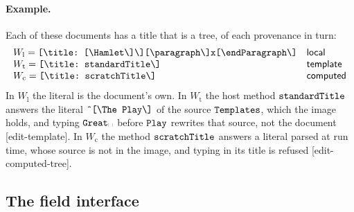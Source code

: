 \documentclass[11pt]{article}
\numberwithin{equation}{section}
\newcommand{\kw}[1]{\ensuremath{\mathsf{#1}}}
\newcommand{\str}[1]{\ensuremath{\text{\texttt{#1}}}}
\newcommand{\bs}{\textbackslash}
\newcommand{\vs}{\text{\textvisiblespace}}
\begin{document}
\paragraph{Example.}  Each of these documents has a title that is a tree,
of each provenance in turn:
\[
\begin{array}{@{}ll@{}}
W_{\mathrm{l}} = \str{[\bs{}title:\ [\bs{}Hamlet\bs]\bs][\bs{}paragraph\bs]x[\bs{}endParagraph\bs]}
  & \kw{local} \\
W_{\mathrm{t}} = \str{[\bs{}title:\ standardTitle\bs]} & \kw{template} \\
W_{\mathrm{c}} = \str{[\bs{}title:\ scratchTitle\bs]} & \kw{computed}
\end{array}
\]
In $W_{\mathrm{l}}$ the literal is the document's own.  In
$W_{\mathrm{t}}$ the host method $\str{standardTitle}$ answers the literal
$\str{\^{}[\bs{}The\ Play\bs]}$ of the source $\str{Templates}$, which the
image holds, and typing $\str{Great}\vs$ before $\str{Play}$ rewrites that
source, not the document [edit-template].  In $W_{\mathrm{c}}$ the method
$\str{scratchTitle}$ answers a literal parsed at run time, whose source is
not in the image, and typing in its title is refused [edit-computed-tree].

\subsection{The field interface}
\label{sec:field}
\end{document}
